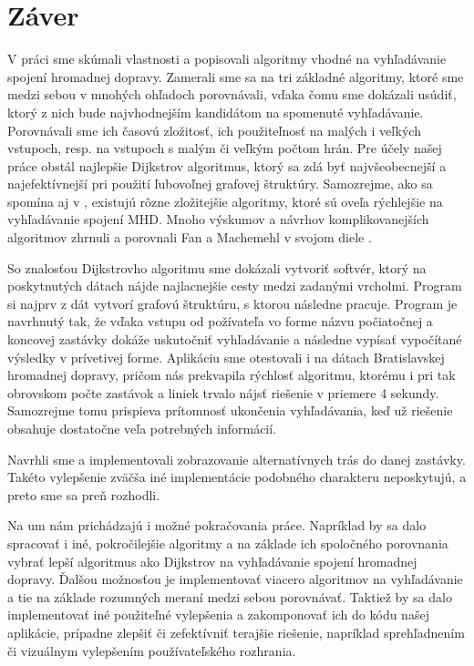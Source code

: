 \chapter*{Záver}  %

V práci sme skúmali vlastnosti a popisovali algoritmy vhodné na vyhľadávanie spojení hromadnej dopravy. Zamerali sme sa na tri základné algoritmy, ktoré sme medzi sebou v mnohých ohľadoch porovnávali, vďaka čomu sme dokázali usúdiť, ktorý z nich bude najvhodnejším kandidátom na spomenuté vyhľadávanie. Porovnávali sme ich časovú zložitosť, ich použiteľnosť na malých i veľkých vstupoch, resp. na vstupoch s malým či veľkým počtom hrán. Pre účely našej práce obstál najlepšie Dijkstrov algoritmus, ktorý sa zdá byť najvšeobecnejší a najefektívnejší pri použití ľubovoľnej grafovej štruktúry. Samozrejme, ako sa spomína aj v \cite{bast2010fast}, existujú rôzne zložitejšie algoritmy, ktoré sú oveľa rýchlejšie na vyhľadávanie spojení MHD. Mnoho výskumov a návrhov komplikovanejších algoritmov zhrnuli a porovnali Fan a Machemehl v svojom diele \cite{fan2004optimal}.

So znalosťou Dijkstrovho algoritmu sme dokázali vytvoriť softvér, ktorý na poskytnutých dátach nájde najlacnejšie cesty medzi zadanými vrcholmi. Program si najprv z dát vytvorí grafovú štruktúru, s ktorou následne pracuje. Program je navrhnutý tak, že vďaka vstupu od požívateľa vo forme názvu počiatočnej a koncovej zastávky dokáže uskutočniť vyhľadávanie a následne vypísať vypočítané výsledky v prívetivej forme. Aplikáciu sme otestovali i na dátach Bratislavskej hromadnej dopravy, pričom nás prekvapila rýchlosť algoritmu, ktorému i pri tak obrovskom počte zastávok a liniek trvalo nájsť riešenie v priemere 4 sekundy. Samozrejme tomu prispieva prítomnosť ukončenia vyhľadávania, keď už riešenie obsahuje dostatočne veľa potrebných informácií.

Navrhli sme a implementovali zobrazovanie alternatívnych trás do danej zastávky. Takéto vylepšenie zväčša iné implementácie podobného charakteru neposkytujú, a preto sme sa preň rozhodli.

Na um nám prichádzajú i možné pokračovania práce. Napríklad by sa dalo spracovať i iné, pokročilejšie algoritmy a na základe ich spoločného porovnania vybrať lepší algoritmus ako Dijkstrov na vyhľadávanie spojení hromadnej dopravy. Ďalšou možnosťou je implementovať viacero algoritmov na vyhľadávanie a tie na základe rozumných meraní medzi sebou porovnávať. Taktiež by sa dalo implementovať iné použiteľné vylepšenia a zakomponovať ich do kódu našej aplikácie, prípadne zlepšiť či zefektívniť terajšie riešenie, napríklad sprehľadnením či vizuálnym vylepšením používateľského rozhrania.

